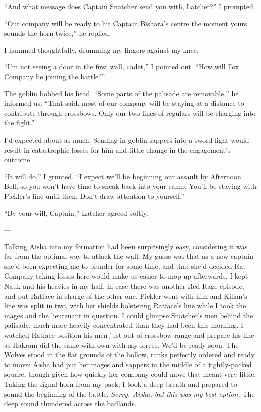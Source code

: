 \documentclass[12pt, openany]{book}
\begin{document}
“And what message does Captain Snatcher send you with, Latcher?” I prompted.

“Our company will be ready to hit Captain Bishara’s centre the moment yours sounds the horn twice,” he replied.

I hummed thoughtfully, drumming my fingers against my knee.

“I’m not seeing a door in the first wall, cadet,” I pointed out. “How will Fox Company be joining the battle?”

The goblin bobbed his head. “Some parts of the palisade are removable,” he informed us. “That said, most of our company will be staying at a distance to contribute through crossbows. Only our two lines of regulars will be charging into the fight.”

I’d expected about as much. Sending in goblin sappers into a sword fight would result in catastrophic losses for him and little change in the engagement’s outcome.

“It will do,” I grunted. “I expect we’ll be beginning our assault by Afternoon Bell, so you won’t have time to sneak back into your camp. You’ll be staying with Pickler’s line until then. Don’t draw attention to yourself.”

“By your will, Captain,” Latcher agreed softly.

—

Talking Aisha into my formation had been surprisingly easy, considering it was far from the optimal way to attack the wall. My guess was that as a new captain she’d been expecting me to blunder for some time, and that she’d decided Rat Company taking losses here would make us easier to mop up afterwards. I kept Nauk and his heavies in my half, in case there was another Red Rage episode, and put Ratface in charge of the other one. Pickler went with him and Kilian’s line was split in two, with her shields bolstering Ratface’s line while I took the mages and the lieutenant in question. I could glimpse Snatcher’s men behind the palisade, much more heavily concentrated than they had been this morning\textit{.} I watched Ratface position his men just out of crossbow range and prepare his line as Hakram did the same with own with my forces. We’d be ready soon. The Wolves stood in the flat grounds of the hollow, ranks perfectly ordered and ready to move: Aisha had put her mages and sappers in the middle of a tightly-packed square, though given how quickly her company could move that meant very little. Taking the signal horn from my pack, I took a deep breath and prepared to sound the beginning of the battle. \textit{Sorry, Aisha, but this was my best option.} The deep sound thundered across the badlands.
\end{document}

